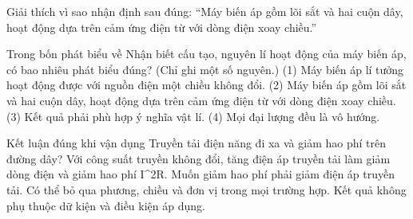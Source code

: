 \begin{bt}
Giải thích vì sao nhận định sau đúng: “Máy biến áp gồm lõi sắt và hai cuộn dây, hoạt động dựa trên cảm ứng điện từ với dòng điện xoay chiều.”
\end{bt}

\begin{ex}
Trong bốn phát biểu về Nhận biết cấu tạo, nguyên lí hoạt động của máy biến áp, có bao nhiêu phát biểu đúng? (Chỉ ghi một số nguyên.) (1) Máy biến áp lí tưởng hoạt động được với nguồn điện một chiều không đổi. (2) Máy biến áp gồm lõi sắt và hai cuộn dây, hoạt động dựa trên cảm ứng điện từ với dòng điện xoay chiều. (3) Kết quả phải phù hợp ý nghĩa vật lí. (4) Mọi đại lượng đều là vô hướng.
\end{ex}

\begin{ex}
Kết luận đúng khi vận dụng Truyền tải điện năng đi xa và giảm hao phí trên đường dây?
\choice
{\True Với công suất truyền không đổi, tăng điện áp truyền tải làm giảm dòng điện và giảm hao phí I^2R.}
{Muốn giảm hao phí phải giảm điện áp truyền tải.}
{Có thể bỏ qua phương, chiều và đơn vị trong mọi trường hợp.}
{Kết quả không phụ thuộc dữ kiện và điều kiện áp dụng.}
\end{ex}

